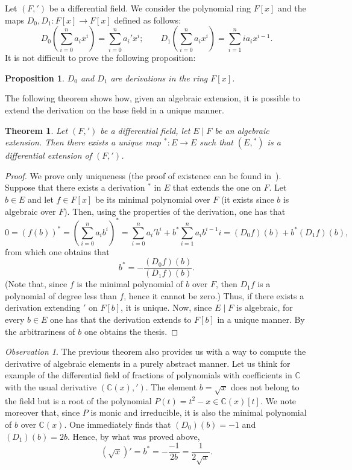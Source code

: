 \documentclass[11pt]{article}
\theoremstyle{plain}
\newtheorem{theorem}{Theorem}
\newtheorem{proposition}{Proposition}
\theoremstyle{definition}
\theoremstyle{remark}
\newtheorem*{observation}{Observation}
\newcommand{\C}{\mathbb{C}}
\begin{document}
Let $(F, ')$ be a differential field. We consider the polynomial ring
$F[x]$ and the maps $D_{0}, D_{1} : F[x] \to F[x]$ defined as follows:
\[
D_{0}\left( \sum_{i=0}^{n} a_{i} x^{i} \right)
= \sum_{i=0}^{n} a_{i}' x^{i};
\qquad
D_{1}\left( \sum_{i=0}^{n} a_{i} x^{i} \right)
= \sum_{i=1}^{n} i a_{i} x^{i-1}.
\]
It is not difficult to prove the following proposition:

\begin{proposition}\label{prop:D0D1}
$D_{0}$ and $D_{1}$ are derivations in the ring $F[x]$.
\end{proposition}

The following theorem shows how, given an algebraic extension, it is
possible to extend the derivation on the base field in a unique manner.

\begin{theorem}\label{thm:extend}
Let $(F, ')$ be a differential field, let $E\mid F$ be an algebraic
extension. Then there exists a unique map ${}^{*} : E \longrightarrow E$
such that $(E, {}^{*})$ is a differential extension of $(F, ')$.
\end{theorem}

\begin{proof}
We prove only uniqueness (the proof of existence can be found
in~\cite{Bronstein}). Suppose that there exists a derivation ${}^{*}$
in $E$ that extends the one on $F$. Let $b \in E$ and let $f \in F[x]$
be its minimal polynomial over $F$ (it exists since $b$ is algebraic
over $F$). Then, using the properties of the derivation, one has that
\[
0 = (f(b))^{*}
= \left( \sum_{i=0}^{n} a_{i} b^{i} \right)^{*}
= \sum_{i=0}^{n} a_{i}' b^{i}
+ b^{*} \sum_{i=1}^{n} a_{i} b^{i-1} i
= (D_{0} f)(b) + b^{*} (D_{1} f)(b),
\]
from which one obtains that
\[
b^{*} = - \frac{(D_{0} f)(b)}{(D_{1} f)(b)}.
\]
(Note that, since $f$ is the minimal polynomial of $b$ over $F$, then
$D_{1} f$ is a polynomial of degree less than $f$, hence it cannot be
zero.) Thus, if there exists a derivation extending $'$ on $F[b]$, it
is unique. Now, since $E\mid F$ is algebraic, for every $b \in E$ one
has that the derivation extends to $F[b]$ in a unique manner. By the
arbitrariness of $b$ one obtains the thesis.
\end{proof}

\begin{observation}
The previous theorem also provides us with a way to compute the
derivative of algebraic elements in a purely abstract manner. Let us
think for example of the differential field of fractions of polynomials
with coefficients in $\C$ with the usual derivative $(\C(x), ')$. The
element $b = \sqrt{x}$ does not belong to the field but is a root of
the polynomial $P(t) = t^{2} - x \in \C(x)[t]$. We note moreover that,
since $P$ is monic and irreducible, it is also the minimal polynomial
of $b$ over $\C(x)$. One immediately finds that $(D_{0})(b) = -1$ and
$(D_{1})(b) = 2b$. Hence, by what was proved above,
\[
(\sqrt{x})' = b^{*} = -\frac{-1}{2b} = \frac{1}{2\sqrt{x}}.
\]
\end{observation}
\end{document}
